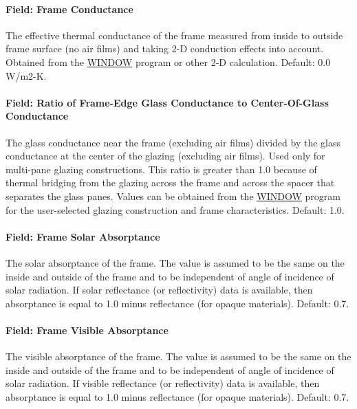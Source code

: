 \paragraph{Field: Frame Conductance}\label{field-frame-conductance}

The effective thermal conductance of the frame measured from inside to outside frame surface (no air films) and taking 2-D conduction effects into account. Obtained from the \href{https://windows.lbl.gov/software-tools#window-heading}{WINDOW} program or other 2-D calculation. Default: 0.0 W/m2-K.

\paragraph{Field: Ratio of Frame-Edge Glass Conductance to Center-Of-Glass Conductance}\label{field-ratio-of-frame-edge-glass-conductance-to-center-of-glass-conductance}

The glass conductance near the frame (excluding air films) divided by the glass conductance at the center of the glazing (excluding air films). Used only for multi-pane glazing constructions. This ratio is greater than 1.0 because of thermal bridging from the glazing across the frame and across the spacer that separates the glass panes. Values can be obtained from the \href{https://windows.lbl.gov/software-tools#window-heading}{WINDOW} program for the user-selected glazing construction and frame characteristics. Default: 1.0.

\paragraph{Field: Frame Solar Absorptance}\label{field-frame-solar-absorptance}

The solar absorptance of the frame. The value is assumed to be the same on the inside and outside of the frame and to be independent of angle of incidence of solar radiation. If solar reflectance (or reflectivity) data is available, then absorptance is equal to 1.0 minus reflectance (for opaque materials). Default: 0.7.

\paragraph{Field: Frame Visible Absorptance}\label{field-frame-visible-absorptance}

The visible absorptance of the frame. The value is assumed to be the same on the inside and outside of the frame and to be independent of angle of incidence of solar radiation. If visible reflectance (or reflectivity) data is available, then absorptance is equal to 1.0 minus reflectance (for opaque materials). Default: 0.7.

